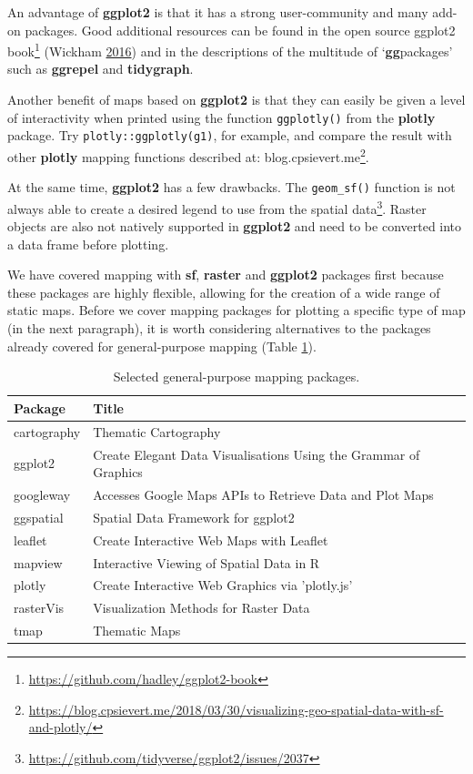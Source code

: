\documentclass[]{krantz}
\let\rmarkdownfootnote\footnote%
\def\footnote{\protect\rmarkdownfootnote}
\renewcommand{\href}[2]{#2\footnote{\url{#1}}}
\begin{document}
An advantage of \textbf{ggplot2} is that it has a strong user-community and many add-on packages.
Good additional resources can be found in the open source \href{https://github.com/hadley/ggplot2-book}{ggplot2 book} (Wickham \protect\hyperlink{ref-wickham_ggplot2_2016}{2016}) and in the descriptions of the multitude of `\textbf{gg}packages' such as \textbf{ggrepel} and \textbf{tidygraph}.

Another benefit of maps based on \textbf{ggplot2} is that they can easily be given a level of interactivity when printed using the function \texttt{ggplotly()} from the \textbf{plotly} package.
Try \texttt{plotly::ggplotly(g1)}, for example, and compare the result with other \textbf{plotly} mapping functions described at: \href{https://blog.cpsievert.me/2018/03/30/visualizing-geo-spatial-data-with-sf-and-plotly/}{blog.cpsievert.me}.

At the same time, \textbf{ggplot2} has a few drawbacks.
The \texttt{geom\_sf()} function is not always able to create a desired legend to use from the spatial \href{https://github.com/tidyverse/ggplot2/issues/2037}{data}.
Raster objects are also not natively supported in \textbf{ggplot2} and need to be converted into a data frame before plotting.

We have covered mapping with \textbf{sf}, \textbf{raster} and \textbf{ggplot2} packages first because these packages are highly flexible, allowing for the creation of a wide range of static maps.
Before we cover mapping packages for plotting a specific type of map (in the next paragraph), it is worth considering alternatives to the packages already covered for general-purpose mapping (Table \ref{tab:map-gpkg}).

\begin{table}[t]

\caption[Selected general-purpose mapping packages.]{\label{tab:map-gpkg}Selected general-purpose mapping packages.}
\centering
\begin{tabular}{l>{\raggedright\arraybackslash}p{9cm}}
\toprule
Package & Title\\
\midrule
cartography & Thematic Cartography\\
ggplot2 & Create Elegant Data Visualisations Using the Grammar of Graphics\\
googleway & Accesses Google Maps APIs to Retrieve Data and Plot Maps\\
ggspatial & Spatial Data Framework for ggplot2\\
leaflet & Create Interactive Web Maps with Leaflet\\
\addlinespace
mapview & Interactive Viewing of Spatial Data in R\\
plotly & Create Interactive Web Graphics via 'plotly.js'\\
rasterVis & Visualization Methods for Raster Data\\
tmap & Thematic Maps\\
\bottomrule
\end{tabular}
\end{table}
\end{document}
